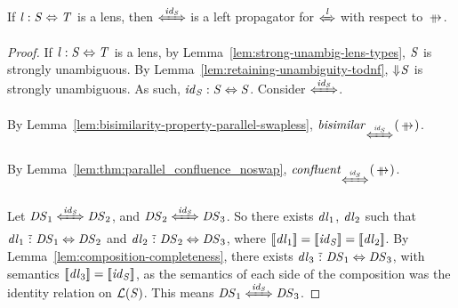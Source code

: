 \documentclass[acmsmall]{acmart}
\begin{document}
\begin{lemma}
  \label{lem:id-left-prop}
  If $\mathit{l} : \mathit{S} \Leftrightarrow \mathit{T}$ is a lens,
  then $\DNFLensHasSemanticsOf{\IdentityLensOf{\Regex}}$ is a left propagator
  for $\DNFLensHasSemanticsOf{\Lens}$ with respect to $\ParallelRewrite$.
\end{lemma}
\begin{proof}
  If $\mathit{l} : \mathit{S} \Leftrightarrow \mathit{T}$ is a lens,
  by Lemma~\ref{lem:strong-unambig-lens-types},
  $\mathit{S}$ is strongly unambiguous.
  By Lemma~\ref{lem:retaining-unambiguity-todnf}, $\Downarrow\mkern-4mu \mathit{S}$ is
  strongly unambiguous.
  As such, $\mathit{id}_{\mathit{S}} : \mathit{S} \Leftrightarrow \mathit{S}$.
  Consider $\DNFLensHasSemanticsOf{\IdentityLensOf{\Regex}}$.
  
  By Lemma~\ref{lem:bisimilarity-property-parallel-swapless},
  $\IsBisimilarWithPropertyOf{\ParallelRewrite}{\DNFLensHasSemanticsOf{\IdentityLensOf{\Regex}}}$.
  
  By Lemma~\ref{lem:thm:parallel_confluence_noswap},
  $\IsConfluentWithPropertyOf{\ParallelRewrite}{\DNFLensHasSemanticsOf{\IdentityLensOf{\Regex}}}$.
  
  Let $\DNFRegex_1 \DNFLensHasSemanticsOf{\IdentityLensOf{\Regex}} \DNFRegex_2$,
  and $\DNFRegex_2 \DNFLensHasSemanticsOf{\IdentityLensOf{\Regex}} \DNFRegex_3$.
  So there exists $\mathit{dl}_1$, $\mathit{dl}_2$ such that
  $\mathit{dl}_1 \,\,\tilde{:}\,\, \mathit{DS}_1 \Leftrightarrow \mathit{DS}_2$ and
  $\mathit{dl}_2 \,\,\tilde{:}\,\, \mathit{DS}_2 \Leftrightarrow \mathit{DS}_3$,
  where $[ \! [\mathit{dl}_1] \! ] = [ \! [\mathit{id}_{\mathit{S}}] \! ] =
  [ \! [\mathit{dl}_2] \! ]$.
  By Lemma~\ref{lem:composition-completeness}, there exists
  $\mathit{dl}_3 \,\,\tilde{:}\,\, \mathit{DS}_1 \Leftrightarrow \mathit{DS}_3$, with
  semantics $[ \! [\mathit{dl}_3] \! ] = [ \! [\mathit{id}_{\mathit{S}}] \! ]$,
  as the semantics of each side of the composition was the identity relation
  on $\mathcal{L}(\mathit{S})$.  This means
  $\DNFRegex_1 \DNFLensHasSemanticsOf{\IdentityLensOf{\Regex}} \DNFRegex_3$.


\end{proof}
\end{document}

